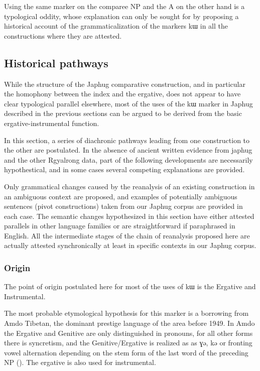 \documentclass[oldfontcommands,oneside,a4paper,11pt]{article}
\newcommand{\ipa}[1]{{\phon #1}} %
\begin{document}
Using the same marker on the comparee NP and the A on the other hand is a typological oddity, whose explanation can only be sought for by proposing a historical account of the grammaticalization of the markers \ipa{kɯ} in all the constructions where they are attested.
 

 
\subsection{Historical pathways}


While the structure of the Japhug comparative construction, and in particular the homophony between the index and the ergative, does not appear to have clear typological parallel elsewhere, most of the uses of the \ipa{kɯ} marker in Japhug described in the previous sections can be argued to be derived from the basic ergative-instrumental function. 

In this section, a series of diachronic pathways leading from one construction to the other are postulated. In the absence of ancient written evidence from japhug and the other Rgyalrong data, part of the following developments are necessarily hypothestical, and in some cases several competing explanations are provided.


Only grammatical changes caused by the reanalysis of an existing construction in an ambiguous context are proposed, and examples of potentially ambiguous sentences (pivot constructions) taken from our Japhug corpus are provided in each case. The semantic changes hypothesized in this section  have either attested parallels in other language families or are straightforward if paraphrased in English. All the intermediate stages of the chain of reanalysis proposed here are actually attested synchronically at least in specific contexts in our Japhug corpus.


 \subsubsection{Origin}
The point of origin postulated here for most of the uses of \ipa{kɯ} is the Ergative and Instrumental. 

The most probable etymological hypothesis for this marker is a borrowing from Amdo Tibetan, the dominant prestige  language of the area before 1949. In Amdo the Ergative and Genitive are only distinguished in pronouns, for all other forms there is syncretism, and the Genitive/Ergative is realized as as \ipa{ɣə}, \ipa{kə} or fronting vowel alternation depending on the stem form of the last word of the preceding NP (\citealt[62]{haller04themchen}). The ergative is also used for instrumental.
\end{document}
